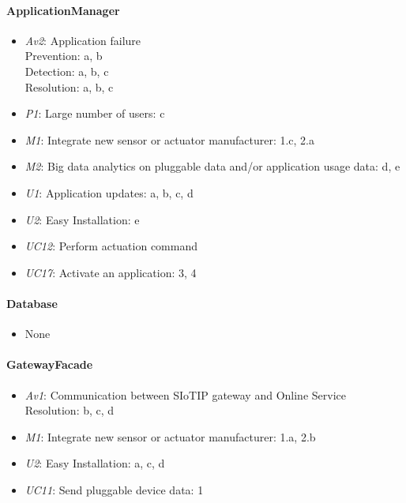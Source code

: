     \paragraph{ApplicationManager}
        \begin{itemize}
            \item \emph{Av2}: Application failure \\
                   Prevention: a, b \\
                   Detection: a, b, c \\
                   Resolution: a, b, c
           \item \emph{P1}: Large number of users: c
           \item \emph{M1}: Integrate new sensor or actuator manufacturer: 1.c, 2.a
           \item \emph{M2}: Big data analytics on pluggable data and/or application usage data: d, e
           \item \emph{U1}: Application updates: a, b, c, d
           \item \emph{U2}: Easy Installation: e
           \item \emph{UC12}: Perform actuation command
           \item \emph{UC17}: Activate an application: 3, 4
        \end{itemize}

    \paragraph{Database}
        \begin{itemize}
          	\item None
        \end{itemize}

    \paragraph{GatewayFacade}
        \begin{itemize}
            \item \emph{Av1}: Communication between SIoTIP gateway and Online Service \\
                              Resolution: b, c, d
            \item \emph{M1}: Integrate new sensor or actuator manufacturer: 1.a, 2.b
            \item \emph{U2}: Easy Installation: a, c, d
            \item \emph{UC11}: Send pluggable device data: 1
        \end{itemize}

